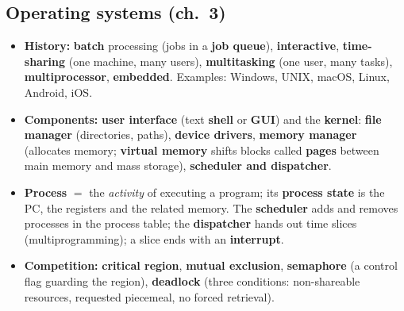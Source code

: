 \documentclass{fkt-notes}
\begin{document}
\subsection{Operating systems (ch.~3)}
\begin{itemize}[nosep]
  \item \textbf{History:} \textbf{batch} processing (jobs in a \textbf{job queue}), \textbf{interactive}, \textbf{time-sharing} (one machine, many users), \textbf{multitasking}
        (one user, many tasks), \textbf{multiprocessor}, \textbf{embedded}. Examples: Windows, UNIX, macOS, Linux, Android, iOS.
  \item \textbf{Components:} \textbf{user interface} (text \textbf{shell} or \textbf{GUI}) and the \textbf{kernel}: \textbf{file manager} (directories, paths),
        \textbf{device drivers}, \textbf{memory manager} (allocates memory; \textbf{virtual memory} shifts blocks called \textbf{pages} between main memory and mass storage),
        \textbf{scheduler and dispatcher}.
  \item \textbf{Process} $=$ the \emph{activity} of executing a program; its \textbf{process state} is the PC, the registers and the related memory.
        The \textbf{scheduler} adds and removes processes in the process table; the \textbf{dispatcher} hands out time slices (multiprogramming); a slice ends with an \textbf{interrupt}.
  \item \textbf{Competition:} \textbf{critical region}, \textbf{mutual exclusion}, \textbf{semaphore} (a control flag guarding the region), \textbf{deadlock} (three conditions: non-shareable
        resources, requested piecemeal, no forced retrieval).
\end{itemize}
\end{document}
